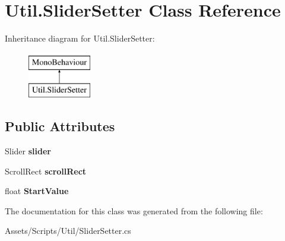 \hypertarget{class_util_1_1_slider_setter}{}\section{Util.\+Slider\+Setter Class Reference}
\label{class_util_1_1_slider_setter}
Inheritance diagram for Util.\+Slider\+Setter\+:\begin{figure}[H]
\begin{center}
\leavevmode
\includegraphics[height=2.000000cm]{class_util_1_1_slider_setter}
\end{center}
\end{figure}
\subsection*{Public Attributes}
\begin{DoxyCompactItemize}
\item 
Slider {\bfseries slider}\hypertarget{class_util_1_1_slider_setter_a62cd8a868eabb986ab3207035ec40267}{}\label{class_util_1_1_slider_setter_a62cd8a868eabb986ab3207035ec40267}

\item 
Scroll\+Rect {\bfseries scroll\+Rect}\hypertarget{class_util_1_1_slider_setter_a3caf6d33b16290ff116a131dad12104a}{}\label{class_util_1_1_slider_setter_a3caf6d33b16290ff116a131dad12104a}

\item 
float {\bfseries Start\+Value}\hypertarget{class_util_1_1_slider_setter_a0df4f45f646465e46667bcac0b6ef2e5}{}\label{class_util_1_1_slider_setter_a0df4f45f646465e46667bcac0b6ef2e5}

\end{DoxyCompactItemize}


The documentation for this class was generated from the following file\+:\begin{DoxyCompactItemize}
\item 
Assets/\+Scripts/\+Util/Slider\+Setter.\+cs\end{DoxyCompactItemize}
